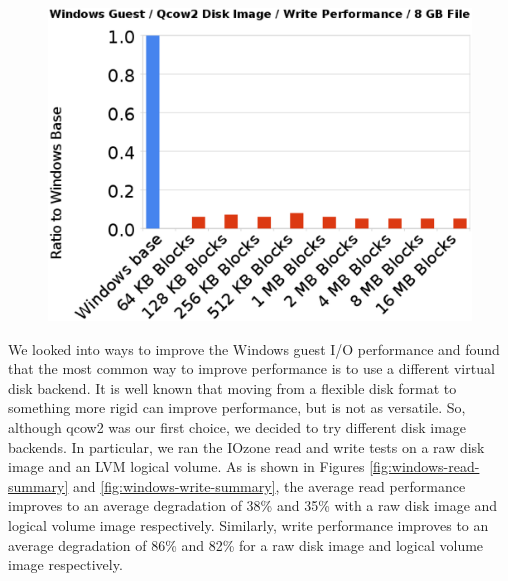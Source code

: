 \begin{figure}[tbp]
\begin{centering}
\label{fig:windows-write}
\includegraphics[scale=.7,angle=90]{figs/windows-write}
\end{centering}
\end{figure}

We looked into ways to improve the Windows guest I/O performance and found that the most common way to improve performance is to use a different virtual disk backend. It is well known that moving from a flexible disk format to something more rigid can improve performance, but is not as versatile. So, although qcow2 was our first choice, we decided to try different disk image backends. In particular, we ran the IOzone read and write tests on a raw disk image and an LVM logical volume. As is shown in Figures \ref{fig:windows-read-summary} and \ref{fig:windows-write-summary}, the average read performance improves to an average degradation of 38\% and 35\% with a raw disk image and logical volume image respectively. Similarly, write performance improves to an average degradation of 86\% and 82\% for a raw disk image and logical volume image respectively.

